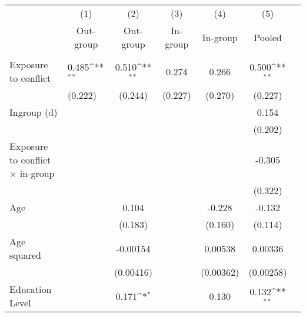 {
\def\sym#1{\ifmmode^{#1}\else\(^{#1}\)\fi}
\begin{tabularx}{\textwidth}{Xl*{5}{c}}
\hline\hline
                    &\multicolumn{1}{c}{(1)}&\multicolumn{1}{c}{(2)}&\multicolumn{1}{c}{(3)}&\multicolumn{1}{c}{(4)}&\multicolumn{1}{c}{(5)}\\
                    &\multicolumn{1}{c}{Out-group}&\multicolumn{1}{c}{Out-group}&\multicolumn{1}{c}{In-group}&\multicolumn{1}{c}{In-group}&\multicolumn{1}{c}{Pooled}\\
\hline
                    &                     &                     &                     &                     &                     \\
Exposure to conflict&       0.485\sym{**} &       0.510\sym{**} &       0.274         &       0.266         &       0.500\sym{**} \\
                    &     (0.222)         &     (0.244)         &     (0.227)         &     (0.270)         &     (0.227)         \\
[0.5em]
Ingroup (d)         &                     &                     &                     &                     &       0.154         \\
                    &                     &                     &                     &                     &     (0.202)         \\
[0.5em]
Exposure to conflict × in-group&                     &                     &                     &                     &      -0.305         \\
                    &                     &                     &                     &                     &     (0.322)         \\
[0.5em]
Age                 &                     &       0.104         &                     &      -0.228         &      -0.132         \\
                    &                     &     (0.183)         &                     &     (0.160)         &     (0.114)         \\
[0.5em]
Age squared         &                     &    -0.00154         &                     &     0.00538         &     0.00336         \\
                    &                     &   (0.00416)         &                     &   (0.00362)         &   (0.00258)         \\
[0.5em]
Education Level     &                     &       0.171\sym{*}  &                     &       0.130         &       0.132\sym{**} \\

\end{tabularx}}
